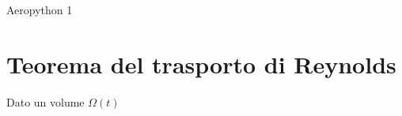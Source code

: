 \documentclass[11pt]{article}
\author{John Doe}
\date{\today}
\title{}
\begin{document}
\tableofcontents

Aeropython 1

\section{Teorema del trasporto di Reynolds}
\label{sec:orgf941cbd}
Dato un volume \(\Omega(t)\)
\end{document}
